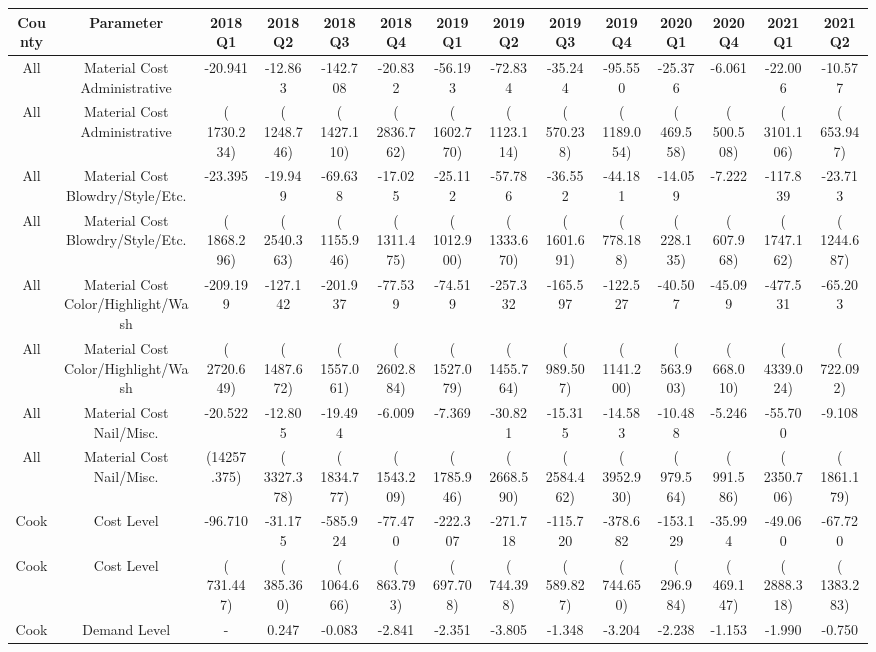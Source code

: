
\centering
\begin{tabular}[t]{cccccccccccccc}
\toprule
County & Parameter & 2018Q1 & 2018Q2 & 2018Q3 & 2018Q4 & 2019Q1 & 2019Q2 & 2019Q3 & 2019Q4 & 2020Q1 & 2020Q4 & 2021Q1 & 2021Q2\\
\midrule
All & Material Cost Administrative & -20.941 & -12.863 & -142.708 & -20.832 & -56.193 & -72.834 & -35.244 & -95.550 & -25.376 & -6.061 & -22.006 & -10.577\\
All & Material Cost Administrative & ( 1730.234) & ( 1248.746) & ( 1427.110) & ( 2836.762) & ( 1602.770) & ( 1123.114) & (  570.238) & ( 1189.054) & (  469.558) & (  500.508) & ( 3101.106) & (  653.947)\\
All & Material Cost Blowdry/Style/Etc. & -23.395 & -19.949 & -69.638 & -17.025 & -25.112 & -57.786 & -36.552 & -44.181 & -14.059 & -7.222 & -117.839 & -23.713\\
All & Material Cost Blowdry/Style/Etc. & ( 1868.296) & ( 2540.363) & ( 1155.946) & ( 1311.475) & ( 1012.900) & ( 1333.670) & ( 1601.691) & (  778.188) & (  228.135) & (  607.968) & ( 1747.162) & ( 1244.687)\\
All & Material Cost Color/Highlight/Wash & -209.199 & -127.142 & -201.937 & -77.539 & -74.519 & -257.332 & -165.597 & -122.527 & -40.507 & -45.099 & -477.531 & -65.203\\
All & Material Cost Color/Highlight/Wash & ( 2720.649) & ( 1487.672) & ( 1557.061) & ( 2602.884) & ( 1527.079) & ( 1455.764) & (  989.507) & ( 1141.200) & (  563.903) & (  668.010) & ( 4339.024) & (  722.092)\\
All & Material Cost Nail/Misc. & -20.522 & -12.805 & -19.494 & -6.009 & -7.369 & -30.821 & -15.315 & -14.583 & -10.488 & -5.246 & -55.700 & -9.108\\
All & Material Cost Nail/Misc. & (14257.375) & ( 3327.378) & ( 1834.777) & ( 1543.209) & ( 1785.946) & ( 2668.590) & ( 2584.462) & ( 3952.930) & (  979.564) & (  991.586) & ( 2350.706) & ( 1861.179)\\
Cook & Cost Level & -96.710 & -31.175 & -585.924 & -77.470 & -222.307 & -271.718 & -115.720 & -378.682 & -153.129 & -35.994 & -49.060 & -67.720\\
Cook & Cost Level & (  731.447) & (  385.360) & ( 1064.666) & (  863.793) & (  697.708) & (  744.398) & (  589.827) & (  744.650) & (  296.984) & (  469.147) & ( 2888.318) & ( 1383.283)\\
Cook & Demand Level & - & 0.247 & -0.083 & -2.841 & -2.351 & -3.805 & -1.348 & -3.204 & -2.238 & -1.153 & -1.990 & -0.750\\

\end{tabular}
